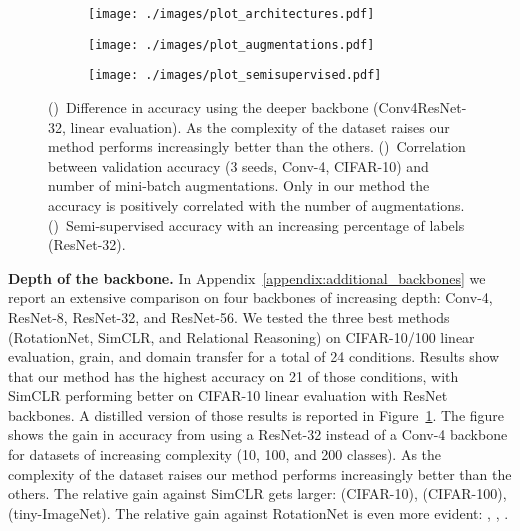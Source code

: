 \documentclass{article}
\begin{document}
\begin{figure}[t!]
    \begin{subfigure}[t]{0.333\textwidth}
        \texttt{[image: ./images/plot\_architectures.pdf]}
        \caption{}
        \label{fig:results-architectures}
    \end{subfigure}\begin{subfigure}[t]{0.333\textwidth}
        \centering
        \texttt{[image: ./images/plot\_augmentations.pdf]}
        \caption{}
        \label{fig:results-augmentations}
    \end{subfigure}
    \begin{subfigure}[t]{0.333\textwidth}
        \centering
        \texttt{[image: ./images/plot\_semisupervised.pdf]}
        \caption{}
        \label{fig:results-semisupervised}
    \end{subfigure}
    \caption{()~Difference in accuracy using the deeper backbone (Conv4ResNet-32, linear evaluation). As the complexity of the dataset raises our method performs increasingly better than the others. ()~Correlation between validation accuracy (3 seeds, Conv-4, CIFAR-10) and number of mini-batch augmentations. Only in our method the accuracy is positively correlated with the number of augmentations. ()~Semi-supervised accuracy with an increasing percentage of labels (ResNet-32).}
    \label{fig:results}
\end{figure}

\textbf{Depth of the backbone.} In Appendix~\ref{appendix:additional_backbones} we report an extensive comparison on four backbones of increasing depth: Conv-4, ResNet-8, ResNet-32, and ResNet-56. We tested the three best methods (RotationNet, SimCLR, and Relational Reasoning) on CIFAR-10/100 linear evaluation, grain, and domain transfer for a total of 24 conditions. Results show that our method has the highest accuracy on 21 of those conditions, with SimCLR performing better on CIFAR-10 linear evaluation with ResNet backbones.
A distilled version of those results is reported in Figure~\ref{fig:results-architectures}. The figure shows the gain in accuracy from using a ResNet-32 instead of a Conv-4 backbone for datasets of increasing complexity (10, 100, and 200 classes). As the complexity of the dataset raises our method performs increasingly better than the others. The relative gain against SimCLR gets larger:  (CIFAR-10),  (CIFAR-100),  (tiny-ImageNet). The relative gain against RotationNet is even more evident: , , .
\end{document}
